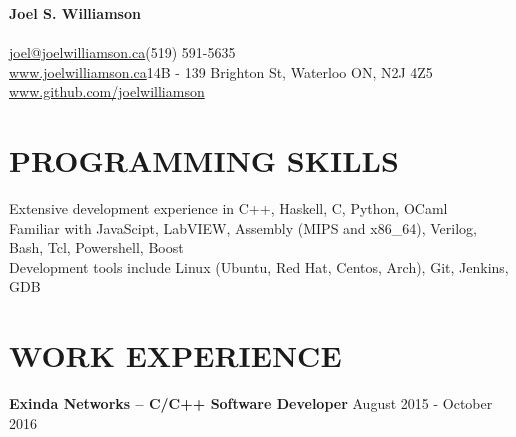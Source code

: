 \documentclass{res}
\begin{document}
 

\begin{center}
{\Large\bf Joel S. Williamson}
\end{center}
\vspace{-5mm}
\paragraph{}
       \href{mailto:joel@joelwilliamson.ca}{joel@joelwilliamson.ca}\hfill(519) 591-5635\\
       \url{www.joelwilliamson.ca}\hfill14B - 139 Brighton St, Waterloo ON, N2J 4Z5\\
       \url{www.github.com/joelwilliamson}
 
\begin{resume}

  \section{PROGRAMMING SKILLS}
  \vspace{3mm}
  Extensive development experience in C++, Haskell, C, Python, OCaml\\
  Familiar with JavaScipt, LabVIEW, Assembly (MIPS and x86\_64), Verilog, Bash, Tcl, Powershell, Boost\\
  Development tools include Linux (Ubuntu, Red Hat, Centos, Arch), Git, Jenkins, GDB
  \section{WORK EXPERIENCE}
  \vspace{3mm}
         {\bf Exinda Networks -- C/C++ Software Developer} \hfill August 2015 - October 2016\vspace{-3mm}


\end{resume}
\end{document}
